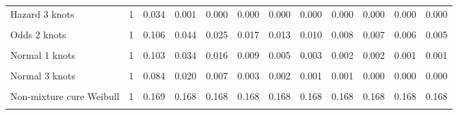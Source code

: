 \documentclass[
]{article}
\begin{document}
\begin{table}[H]
{\begin{tabular}[t]{lrrrrrrrrrrr}
Hazard 3 knots & 1 & 0.034 & 0.001 & 0.000 & 0.000 & 0.000 & 0.000 & 0.000 & 0.000 & 0.000 & 0.000\\
\cellcolor{gray!10}{Odds 1 knots} & \cellcolor{gray!10}{1} & \cellcolor{gray!10}{0.115} & \cellcolor{gray!10}{0.052} & \cellcolor{gray!10}{0.032} & \cellcolor{gray!10}{0.023} & \cellcolor{gray!10}{0.017} & \cellcolor{gray!10}{0.014} & \cellcolor{gray!10}{0.012} & \cellcolor{gray!10}{0.010} & \cellcolor{gray!10}{0.009} & \cellcolor{gray!10}{0.008}\\
Odds 2 knots & 1 & 0.106 & 0.044 & 0.025 & 0.017 & 0.013 & 0.010 & 0.008 & 0.007 & 0.006 & 0.005\\
\cellcolor{gray!10}{Odds 3 knots} & \cellcolor{gray!10}{1} & \cellcolor{gray!10}{0.094} & \cellcolor{gray!10}{0.033} & \cellcolor{gray!10}{0.018} & \cellcolor{gray!10}{0.011} & \cellcolor{gray!10}{0.008} & \cellcolor{gray!10}{0.006} & \cellcolor{gray!10}{0.005} & \cellcolor{gray!10}{0.004} & \cellcolor{gray!10}{0.003} & \cellcolor{gray!10}{0.003}\\
Normal 1 knots & 1 & 0.103 & 0.034 & 0.016 & 0.009 & 0.005 & 0.003 & 0.002 & 0.002 & 0.001 & 0.001\\
\cellcolor{gray!10}{Normal 2 knots} & \cellcolor{gray!10}{1} & \cellcolor{gray!10}{0.101} & \cellcolor{gray!10}{0.033} & \cellcolor{gray!10}{0.015} & \cellcolor{gray!10}{0.008} & \cellcolor{gray!10}{0.005} & \cellcolor{gray!10}{0.003} & \cellcolor{gray!10}{0.002} & \cellcolor{gray!10}{0.001} & \cellcolor{gray!10}{0.001} & \cellcolor{gray!10}{0.001}\\
Normal 3 knots & 1 & 0.084 & 0.020 & 0.007 & 0.003 & 0.002 & 0.001 & 0.001 & 0.000 & 0.000 & 0.000\\
\cellcolor{gray!10}{Mixture cure Weibull} & \cellcolor{gray!10}{1} & \cellcolor{gray!10}{0.179} & \cellcolor{gray!10}{0.179} & \cellcolor{gray!10}{0.179} & \cellcolor{gray!10}{0.179} & \cellcolor{gray!10}{0.179} & \cellcolor{gray!10}{0.179} & \cellcolor{gray!10}{0.179} & \cellcolor{gray!10}{0.179} & \cellcolor{gray!10}{0.179} & \cellcolor{gray!10}{0.179}\\
Non-mixture cure Weibull & 1 & 0.169 & 0.168 & 0.168 & 0.168 & 0.168 & 0.168 & 0.168 & 0.168 & 0.168 & 0.168\\
\cellcolor{gray!10}{Mixture cure Log-normal} & \cellcolor{gray!10}{1} & \cellcolor{gray!10}{0.134} & \cellcolor{gray!10}{0.111} & \cellcolor{gray!10}{0.108} & \cellcolor{gray!10}{0.108} & \cellcolor{gray!10}{0.108} & \cellcolor{gray!10}{0.108} & \cellcolor{gray!10}{0.108} & \cellcolor{gray!10}{0.108} & \cellcolor{gray!10}{0.108} & \cellcolor{gray!10}{0.108}\\

\end{tabular}}
\end{table}
\end{document}
